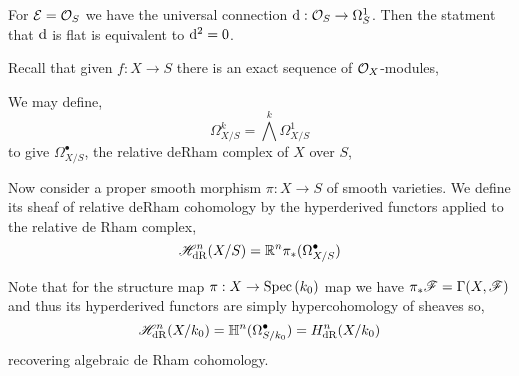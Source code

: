 \documentclass[12pt]{article}
\begin{document}
\begin{example}
For $\mathcal{E} = \mathcal{O}_{S}$ we have the universal connection $\mathrm{d} : \mathcal{O}_{S} \to \Omega^1_S$. Then the statment that $\mathrm{d}$ is flat is equivalent to $\mathrm{d}^2 = 0$. 
\end{example}

\begin{remark}
Recall that given $f : X \to S$ there is an exact sequence of $\mathcal{O}_{X}$-modules,
\begin{center}
\end{center}
We may define,
\[ \Omega^k_{X / S} = \bigwedge^k \Omega^1_{X / S} \]
to give $\Omega^\bullet_{X / S}$, the relative deRham complex of $X$ over $S$,
\begin{center}
\end{center}
\end{remark}

\begin{definition}
Now consider a proper smooth morphism $\pi : X \to S$ of smooth varieties. We define its sheaf of relative deRham cohomology by the hyperderived functors applied to the relative de Rham complex,
\[ \mathscr{H}^n_{\mathrm{dR}}(X / S) = \mathbb{R}^n \pi_*(\Omega^\bullet_{X / S}) \]
\end{definition}

\begin{remark}
Note that for the structure map $\pi : X \to \mathrm{Spec}\left( k_0 \right)$ map we have $\pi_* \mathscr{F} = \Gamma(X, \mathscr{F})$ and thus its hyperderived functors are simply hypercohomology of sheaves so,
\[ \mathscr{H}_{\mathrm{dR}}^n(X / k_0) = \mathbb{H}^n(\Omega^\bullet_{S/ k_0}) = H^n_{\mathrm{dR}}(X / k_0) \]
recovering algebraic de Rham cohomology. 
\end{remark}
\end{document}
